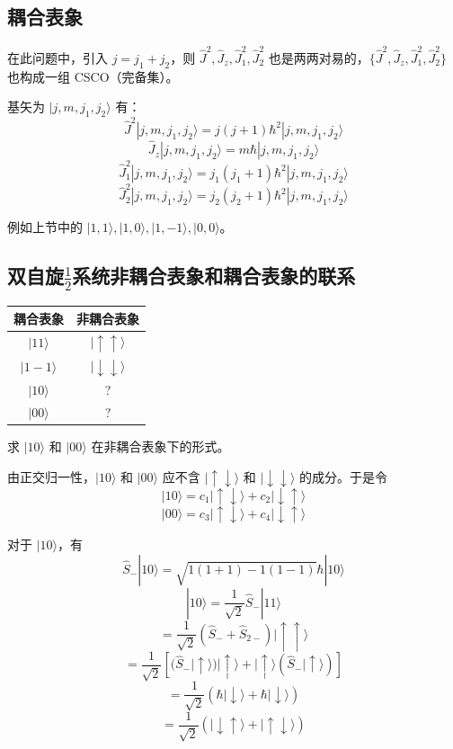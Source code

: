 \documentclass[lang=cn,10pt]{elegantbook}
\begin{document}
\subsection{耦合表象}
在此问题中，引入 $j = j_1 + j_2$，则 $\hat{J}^2, \hat{J}_z, \hat{J}_1^2, \hat{J}_2^2$ 也是两两对易的，$\{\hat{J}^2, \hat{J}_z, \hat{J}_1^2, \hat{J}_2^2\}$ 也构成一组 CSCO（完备集）。

基矢为 $|j, m, j_1, j_2\rangle$ 有：
\[
\hat{J}^2 |j, m, j_1, j_2\rangle = j(j+1) \hbar^2 |j, m, j_1, j_2\rangle
\]
\[
\hat{J}_z |j, m, j_1, j_2\rangle = m \hbar |j, m, j_1, j_2\rangle
\]
\[
\hat{J}_1^2 |j, m, j_1, j_2\rangle = j_1(j_1+1) \hbar^2 |j, m, j_1, j_2\rangle
\]
\[
\hat{J}_2^2 |j, m, j_1, j_2\rangle = j_2(j_2+1) \hbar^2 |j, m, j_1, j_2\rangle
\]

例如上节中的 $|1, 1\rangle, |1, 0\rangle, |1, -1\rangle, |0, 0\rangle$。
\subsection{双自旋$\frac{1}{2}$系统非耦合表象和耦合表象的联系}
\begin{table}[h]
	\centering
	\begin{tabular}{|c|c|}
		\hline
		耦合表象 & 非耦合表象 \\ \hline
		$|11\rangle$ & $|\uparrow\uparrow\rangle$ \\ \hline
		$|1-1\rangle$ & $|\downarrow\downarrow\rangle$ \\ \hline
		$|10\rangle$ & ? \\ \hline
		$|00\rangle$ & ? \\ \hline
	\end{tabular}
\end{table}

求 $|10\rangle$ 和 $|00\rangle$ 在非耦合表象下的形式。

由正交归一性，$|10\rangle$ 和 $|00\rangle$ 应不含 $|\uparrow\downarrow\rangle$ 和 $|\downarrow\downarrow\rangle$ 的成分。于是令
\[
|10\rangle = c_1 |\uparrow\downarrow\rangle + c_2 |\downarrow\uparrow\rangle
\]
\[
|00\rangle = c_3 |\uparrow\downarrow\rangle + c_4 |\downarrow\uparrow\rangle
\]

对于 $|10\rangle$，有
\[
\hat{S}_- |10\rangle = \sqrt{1(1+1) - 1(1-1)} \hbar |10\rangle
\]
\[
|10\rangle = \frac{1}{\sqrt{2}} \hat{S}_- |11\rangle
\]
\[
= \frac{1}{\sqrt{2}} (\hat{S}_- + \hat{S}_{2-}) |\uparrow\uparrow\rangle
\]
\[
= \frac{1}{\sqrt{2}} \left[ (\hat{S}_- |\uparrow\rangle) |\uparrow\rangle + |\uparrow\rangle (\hat{S}_- |\uparrow\rangle) \right]
\]
\[
= \frac{1}{\sqrt{2}} \left( \hbar |\downarrow\rangle + \hbar |\downarrow\rangle \right)
\]
\[
= \frac{1}{\sqrt{2}} (|\downarrow\uparrow\rangle + |\uparrow\downarrow\rangle)
\]
\end{document}
